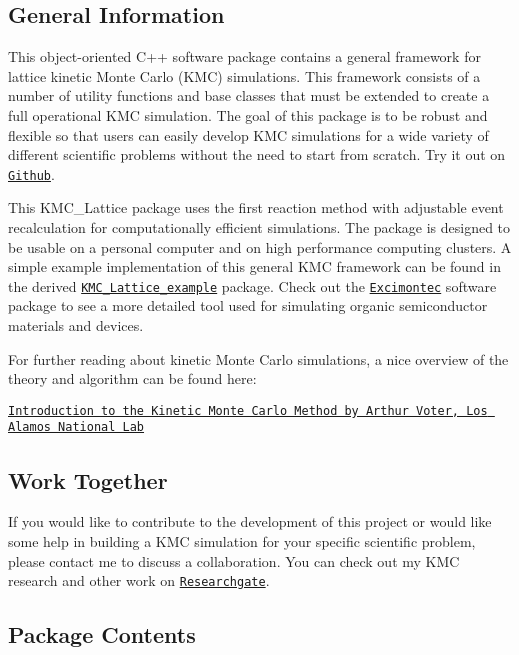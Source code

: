 \subsection*{General Information}

This object-\/oriented C++ software package contains a general framework for lattice kinetic Monte Carlo (K\+MC) simulations. This framework consists of a number of utility functions and base classes that must be extended to create a full operational K\+MC simulation. The goal of this package is to be robust and flexible so that users can easily develop K\+MC simulations for a wide variety of different scientific problems without the need to start from scratch. Try it out on \href{https://github.com/MikeHeiber/KMC_Lattice}{\tt Github}.

This K\+M\+C\+\_\+\+Lattice package uses the first reaction method with adjustable event recalculation for computationally efficient simulations. The package is designed to be usable on a personal computer and on high performance computing clusters. A simple example implementation of this general K\+MC framework can be found in the derived \href{https://github.com/MikeHeiber/KMC_Lattice_example}{\tt K\+M\+C\+\_\+\+Lattice\+\_\+example} package. Check out the \href{https://github.com/MikeHeiber/Excimontec}{\tt Excimontec} software package to see a more detailed tool used for simulating organic semiconductor materials and devices.

For further reading about kinetic Monte Carlo simulations, a nice overview of the theory and algorithm can be found here\+:

\href{http://www.fml.t.u-tokyo.ac.jp/~izumi/CMS/MC/Introduction_kMC.pdf}{\tt Introduction to the Kinetic Monte Carlo Method by Arthur Voter, Los Alamos National Lab}

\subsection*{Work Together}

If you would like to contribute to the development of this project or would like some help in building a K\+MC simulation for your specific scientific problem, please contact me to discuss a collaboration. You can check out my K\+MC research and other work on \href{https://www.researchgate.net/profile/Michael_Heiber}{\tt Researchgate}.

\subsection*{Package Contents}

